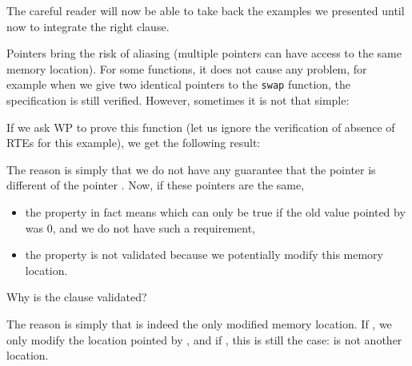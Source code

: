 


The careful reader will now be able to take back the examples we
presented until now to integrate the right  clause.





Pointers bring the risk of aliasing (multiple pointers can have access
to the same memory location). For some functions, it does not cause any
problem, for example when we give two identical pointers to the
\texttt{swap} function, the specification is still verified. However,
sometimes it is not that simple:






If we ask WP to prove this function (let us ignore the verification of absence
of RTEs for this example), we get the following result:





The reason is simply that we do not have any guarantee that the pointer
 is different of the pointer . Now, if these
pointers are the same,



\begin{itemize}
\item   the property  in fact
  means  which can only
  be true if the old value pointed by  was $0$, and we do
  not have such a requirement,
\item
  the property  is not validated
  because we potentially modify this memory location.
\end{itemize}


\begin{Question}
  Why is the  clause validated?

  The reason is simply that  is indeed the only modified memory
  location. If , we only modify the location pointed by
  , and if , this is still the case:
   is not another location.
\end{Question}


